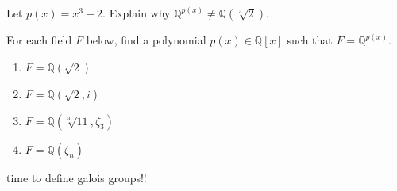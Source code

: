 \begin{problem}
Let $p(x) = x^3 - 2$. Explain why $\mathbb{Q}^{p(x)}\neq\mathbb{Q}(\sqrt[3]{2})$.
\end{problem}

\begin{problem}
For each field $F$ below, find a polynomial $p(x)\in \mathbb{Q}[x]$ such that $F=\mathbb{Q}^{p(x)}$.
\begin{multicols}{2}
\begin{enumerate}
\item $F=\mathbb{Q}(\sqrt{2})$
\item $F=\mathbb{Q}(\sqrt{2},i)$
\item $F=\mathbb{Q}(\sqrt[3]{11},\zeta_3)$
\item $F=\mathbb{Q}(\zeta_n)$
\end{enumerate}
\end{multicols}
\end{problem}

time to define galois groups!!


